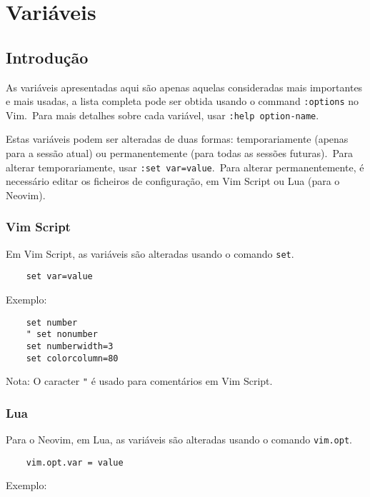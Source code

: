 \chapter{Variáveis}
\label{chap:variaveis}

\section{Introdução}

As variáveis apresentadas aqui são apenas aquelas consideradas mais importantes e mais usadas, a lista completa pode ser obtida usando o command \texttt{:options} no Vim.\ Para mais detalhes sobre cada variável, usar \texttt{:help option-name}.

Estas variáveis podem ser alteradas de duas formas: temporariamente (apenas para a sessão atual) ou permanentemente (para todas as sessões futuras).\ Para alterar temporariamente, usar \texttt{:set var=value}.\ Para alterar permanentemente, é necessário editar os ficheiros de configuração, em Vim Script ou Lua (para o Neovim).

\subsection*{Vim Script}

Em Vim Script, as variáveis são alteradas usando o comando \texttt{set}.

\begin{lstlisting}
    set var=value
\end{lstlisting}

Exemplo:

\begin{lstlisting}
    set number
    " set nonumber
    set numberwidth=3
    set colorcolumn=80
\end{lstlisting}

Nota: O caracter \texttt{"} é usado para comentários em Vim Script.

\subsection*{Lua}

Para o Neovim, em Lua, as variáveis são alteradas usando o comando \texttt{vim.opt}.

\begin{lstlisting}
    vim.opt.var = value
\end{lstlisting}

Exemplo:

